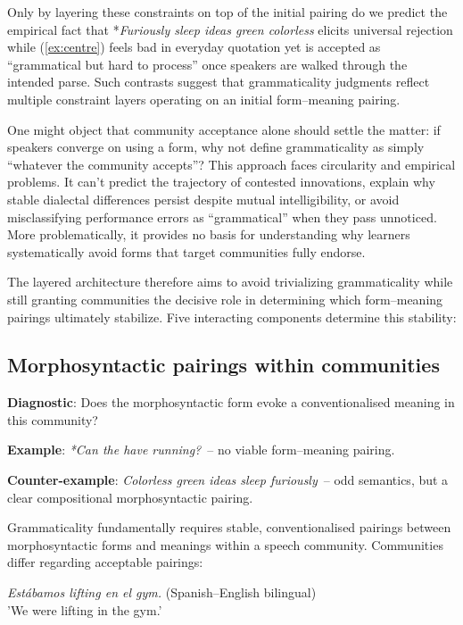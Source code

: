 \documentclass[12pt]{article}
\begin{document}
Only by layering these constraints on top of the initial pairing do we predict the empirical fact that *\textit{Furiously sleep ideas green colorless} elicits universal rejection while (\ref{ex:centre}) feels bad in everyday quotation yet is accepted as \enquote{grammatical but hard to process} once speakers are walked through the intended parse.  Such contrasts suggest that grammaticality judgments reflect multiple constraint layers operating on an initial form–meaning pairing.

One might object that community acceptance alone should settle the matter: if speakers converge on using a form, why not define grammaticality as simply \enquote{whatever the community accepts}? This approach faces circularity and empirical problems. It can't predict the trajectory of contested innovations, explain why stable dialectal differences persist despite mutual intelligibility, or avoid misclassifying performance errors as \enquote{grammatical} when they pass unnoticed. More problematically, it provides no basis for understanding why learners systematically avoid forms that target communities fully endorse.

The layered architecture therefore aims to avoid trivializing grammaticality while still granting communities the decisive role in determining which form–meaning pairings ultimately stabilize. Five interacting components determine this stability:

\subsection{Morphosyntactic pairings within communities}

\begin{tcolorbox}[colback=lsLightBlue!30]
\textbf{Diagnostic}: Does the morphosyntactic form evoke a conventionalised meaning in this community?

\textbf{Example}: \textit{*Can the have running?}~-- no viable form–meaning pairing.

\textbf{Counter-example}: \textit{Colorless green ideas sleep furiously}~-- odd semantics, but a clear compositional morphosyntactic pairing.
\end{tcolorbox}

Grammaticality fundamentally requires stable, conventionalised pairings between morphosyntactic forms and meanings within a speech community. Communities differ regarding acceptable pairings:

\ea
\textit{Estábamos lifting en el gym.} (Spanish–English bilingual)\\
'We were lifting in the gym.'
\z
\end{document}
